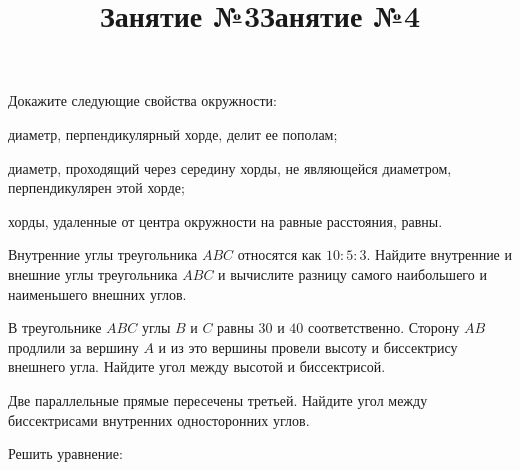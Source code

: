 \newpage
\title{Занятие №3}
\begin{listofex}
	\item Докажите следующие свойства окружности:
	\begin{enumcols}[itemcolumns=1]
		\item диаметр, перпендикулярный хорде, делит ее пополам;
		\item диаметр, проходящий через середину хорды, не являющейся диаметром, перпендикулярен этой хорде;
		\item хорды, удаленные от центра окружности на равные расстояния, равны.
	\end{enumcols}
	\item {}
	\item {}
	\item {}
	\item {}
	\item {}
	\item {}
	\item {}
	\item {}
\end{listofex}
\newpage
\title{Занятие №4}
	\begin{listofex}
		\item Внутренние углы треугольника \( ABC \) относятся как \( 10:5:3 \). Найдите внутренние и внешние углы треугольника \( ABC \) и вычислите разницу самого наибольшего и наименьшего внешних углов. 
	\item В треугольнике \( ABC \) углы \( B \) и \( C \) равны \( 30 \) и \( 40 \) соответственно. Сторону \( AB \) продлили за вершину \( A \) и из это вершины провели высоту и биссектрису внешнего угла. Найдите угол между высотой и биссектрисой. 
	\item Две параллельные прямые пересечены третьей. Найдите угол между биссектрисами внутренних односторонних углов.
	\item {}
	\item {}
	\item {}
	\item {}
	\item Решить уравнение:
	\begin{enumcols}[itemcolumns=2]
		\item {}
		\item {}
	\end{enumcols}
\end{listofex}
